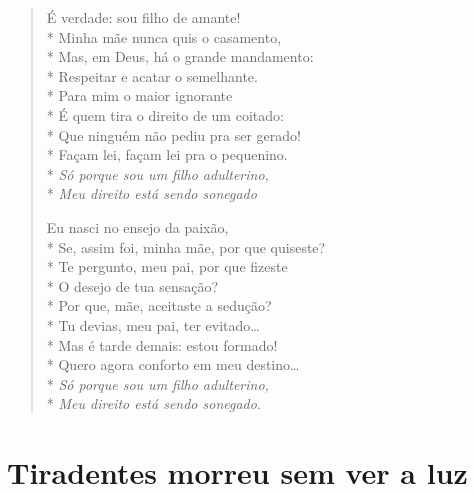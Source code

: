 \begin{verse}
É verdade: sou filho de amante!\\*
Minha mãe nunca quis o casamento,\\*
Mas, em Deus, há o grande mandamento:\\*
Respeitar e acatar o semelhante.\\*
Para mim o maior ignorante\\*
É quem tira o direito de um coitado:\\*
Que ninguém não pediu pra ser gerado!\\*
Façam lei, façam lei pra o pequenino.\\*
\textit{Só porque sou um filho adulterino,}\\*
\textit{Meu direito está sendo sonegado}

Eu nasci no ensejo da paixão,\\*
Se, assim foi, minha mãe, por que quiseste?\\*
Te pergunto, meu pai, por que fizeste\\*
O desejo de tua sensação?\\*
Por que, mãe, aceitaste a sedução?\\*
Tu devias, meu pai, ter evitado\ldots{}\\*
Mas é tarde demais: estou formado!\\*
Quero agora conforto em meu destino\ldots{}\\*
\textit{Só porque sou um filho adulterino,}\\*
\textit{Meu direito está sendo sonegado}.
\end{verse}


\chapter{Tiradentes morreu sem ver a luz}

